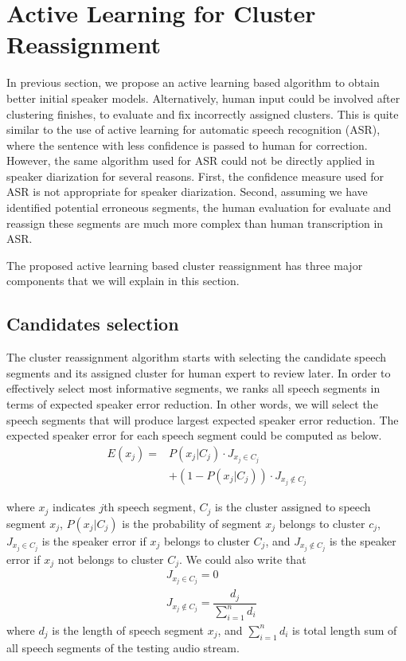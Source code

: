 \documentclass[final,authoryear,5p,times,twocolumn]{elsarticle}
\begin{document}
\section{Active Learning for Cluster Reassignment}
In previous section, we propose an active learning based algorithm to obtain better initial speaker models. Alternatively, human input could be involved after clustering finishes, to evaluate and fix incorrectly assigned clusters. This is quite similar to the use of active learning for automatic speech recognition (ASR), where the sentence with less confidence is passed to human for correction. However, the same algorithm used for ASR could not be directly applied in speaker diarization for several reasons. First, the confidence measure used for ASR is not appropriate for speaker diarization. Second, assuming we have identified potential erroneous segments, the human evaluation for evaluate and reassign these segments are much more complex than human transcription in ASR.

The proposed active learning based cluster reassignment has three major components that we will explain in this section. 

\subsection{Candidates selection}
The cluster reassignment algorithm starts with selecting the candidate speech segments and its assigned cluster for human expert to review later. In order to effectively select most informative segments, we ranks all speech segments in terms of expected speaker error reduction. In other words, we will select the speech segments that will produce largest expected speaker error reduction. 
The expected speaker error for each speech segment could be computed as below. 
\begin{equation}
\begin{aligned}
E(x_j) =& P(x_j | C_j) \cdot J_{x_j \in C_j} \\
&+ (1 - P(x_j | C_j)) \cdot J_{x_j \notin C_j}
\label{expect}
\end{aligned}
\end{equation}

where $x_j$ indicates $j$th speech segment, $C_j$ is the cluster assigned to speech segment $x_j$, $P(x_j|C_j)$ is the probability of segment $x_j$ belongs to cluster $c_j$, $J_{x_j \in C_j} $ is the speaker error if $x_j$ belongs to cluster $C_j$, and $J_{x_j \notin C_j}$ is the speaker error if $x_j$ not belongs to cluster $C_j$. We could also write that
\begin{equation}
\begin{aligned}
&J_{x_j \in C_j} = 0 \\
&J_{x_j \notin C_j} = \dfrac{d_j}{\sum_{i=1}^{n} d_i}
\label{jj}
\end{aligned}
\end{equation} 
where $d_j$ is the length of speech segment $x_j$, and $\sum_{i=1}^{n} d_i$ is total length sum of all speech segments of the testing audio stream.
\end{document}
